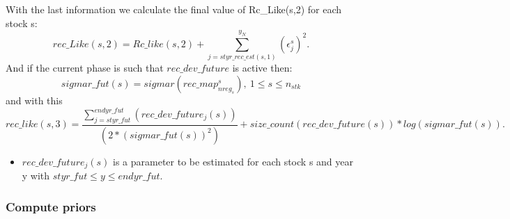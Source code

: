 \documentclass{article}
\begin{document}
With the last information we calculate the final value of Rc\_Like(s,2) for each stock s:
\begin{equation}
    rec\_Like(s,2) = Rc\_like(s,2)+ \sum_{j=styr\_rec\_est(s,1)}^{y_N}( \epsilon^s_j)^2.
\end{equation}
And if the current phase is such that  $rec\_dev\_future$ is active then: 
\begin{equation}
    sigmar\_fut(s)=sigmar(rec\_map^s_{nreg_s}), \ 1\leq s \leq n_{stk}
\end{equation}
and with this
\begin{equation}
    rec\_like(s,3) = \dfrac{ \displaystyle\sum_{j=styr\_fut}^{endyr\_fut}(rec\_dev\_future_j(s))}{(2*(sigmar\_fut(s))^2)} + size\_count(rec\_dev\_future(s))*log(sigmar\_fut(s)).
\end{equation}
\begin{itemize}
    \item $rec\_dev\_future_j(s)$ is a parameter to be estimated for each stock s and year y with $styr\_fut \leq y \leq endyr\_fut$.
\end{itemize}



\subsubsection{Compute priors}
\end{document}
